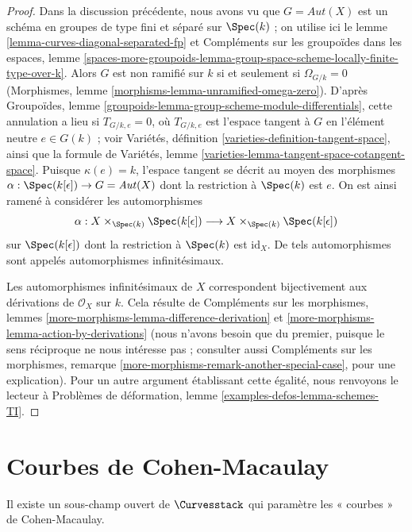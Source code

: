 \begin{proof}
Dans la discussion précédente, nous avons vu que $G = \mathit{Aut}(X)$
est un schéma en groupes de type fini et séparé sur $\Spec(k)$ ;
on utilise ici le lemme \ref{lemma-curves-diagonal-separated-fp} et
Compléments sur les groupoïdes dans les espaces, lemme
\ref{spaces-more-groupoids-lemma-group-space-scheme-locally-finite-type-over-k}.
Alors $G$ est non ramifié sur $k$ si et seulement si $\Omega_{G/k} = 0$
(Morphismes, lemme \ref{morphisms-lemma-unramified-omega-zero}).
D'après Groupoïdes, lemme
\ref{groupoids-lemma-group-scheme-module-differentials}, cette annulation
a lieu si $T_{G/k, e} = 0$, où $T_{G/k, e}$ est l'espace tangent à $G$
en l'élément neutre $e \in G(k)$ ; voir Variétés, définition
\ref{varieties-definition-tangent-space}, ainsi que la formule de
Variétés, lemme \ref{varieties-lemma-tangent-space-cotangent-space}.
Puisque $\kappa(e) = k$, l'espace tangent se décrit au moyen des
morphismes $\alpha : \Spec(k[\epsilon]) \to G = \mathit{Aut}(X)$
dont la restriction à $\Spec(k)$ est $e$.
On est ainsi ramené à considérer les automorphismes
$$
\alpha :
X \times_{\Spec(k)} \Spec(k[\epsilon])
\longrightarrow
X \times_{\Spec(k)} \Spec(k[\epsilon])
$$
sur $\Spec(k[\epsilon])$ dont la restriction à $\Spec(k)$ est
$\text{id}_X$. De tels automorphismes sont appelés
automorphismes infinitésimaux.

\medskip\noindent
Les automorphismes infinitésimaux de $X$ correspondent bijectivement
aux dérivations de $\mathcal{O}_X$ sur $k$. Cela résulte de
Compléments sur les morphismes, lemmes
\ref{more-morphisms-lemma-difference-derivation} et
\ref{more-morphisms-lemma-action-by-derivations} (nous n'avons besoin que
du premier, puisque le sens réciproque ne nous intéresse pas ; consulter
aussi Compléments sur les morphismes, remarque
\ref{more-morphisms-remark-another-special-case}, pour une explication).
Pour un autre argument établissant cette égalité, nous renvoyons le lecteur
à Problèmes de déformation, lemme \ref{examples-defos-lemma-schemes-TI}.
\end{proof}





\section{Courbes de Cohen-Macaulay}
\label{section-CM}

\noindent
Il existe un sous-champ ouvert de $\Curvesstack$ qui paramètre
les « courbes » de Cohen-Macaulay.

